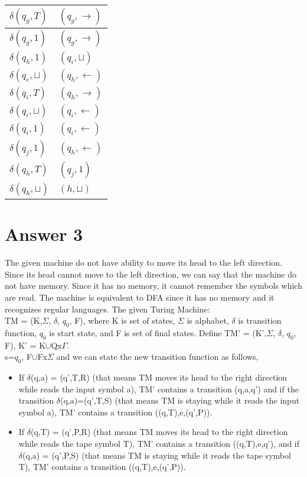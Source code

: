 \documentclass[12pt]{article}
\begin{document}
\begin{table}[H]
\begin{tabular}{|l|l|}
$\delta(q_g,T)$      & $(q_g,\rightarrow)$ \\ \hline
$\delta(q_g,1)$      & $(q_g,\rightarrow)$ \\ \hline
$\delta(q_h,1)$      & $(q_i,\sqcup)$      \\ \hline
$\delta(q_e,\sqcup)$ & $(q_h,\leftarrow)$  \\ \hline
$\delta(q_i,T)$      & $(q_h,\rightarrow)$ \\ \hline
$\delta(q_i,\sqcup)$ & $(q_i,\leftarrow)$  \\ \hline
$\delta(q_i,1)$      & $(q_i,\leftarrow)$  \\ \hline
$\delta(q_j,1)$      & $(q_h,\leftarrow)$  \\ \hline
$\delta(q_h,T)$      & $(q_j,1)$           \\ \hline
$\delta(q_h,\sqcup)$ & $(h,\sqcup)$        \\ \hline
\end{tabular}
\end{table}


\section*{Answer 3}
The given machine do not have ability to move its head to the left direction. Since its head cannot move to the left direction, we can say that the machine do not have memory. Since it has no memory, it cannot remember the symbols which are read. The machine is equivalent to DFA since it has no memory and it recognizes regular languages.
The given Turing Machine:\\
TM = (K,$\Sigma$, $\delta$, $q_0$, F), where K is set of states, $\Sigma$ is alphabet, $\delta$ is transition function, $q_0$ is start state, and F is set of final states.
Define TM' = (K',$\Sigma$, $\delta$, $q_0$, F), K' = K$\cup$Qx$\Gamma$.\\
s=$q_0$, F$\cup$Fx$\Sigma$ and we can state the new transition function as follows,\\
\begin{itemize}
	\item If $\delta$(q,a) = (q',T,R) (that means TM moves its head to the right direction while reads the input symbol a), TM' contains a transition (q,a,q') and if the transition $\delta$(q,a)=(q',T,S) (that means TM is staying while it reads the input symbol a), TM' contains a transition ((q,T),e,(q',P)).
	\item If $\delta$(q,T) = (q',P,R) (that means TM moves its head to the right direction while reads the tape symbol T), TM' contains a transition ((q,T),e,q'), and if $\delta$(q,a) = (q',P,S) (that means TM is staying while it reads the tape symbol T), TM' contains a transition ((q,T),e,(q',P)).
\end{itemize}
\end{document}
